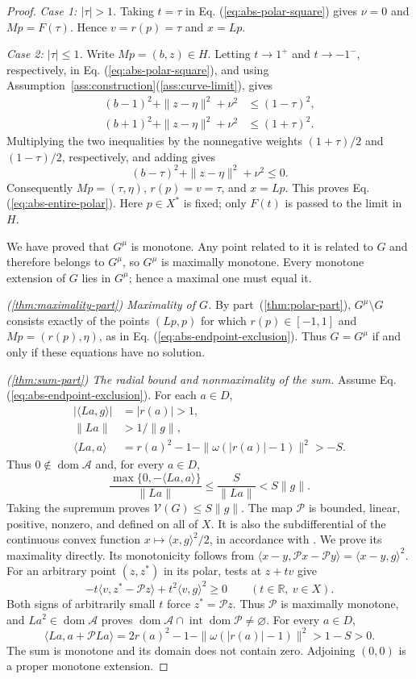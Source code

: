 \documentclass[11pt]{article}
\newcommand{\R}{\mathbb R}
\newcommand{\dom}{\operatorname{dom}}
\newcommand{\pair}[2]{\langle #1,#2\rangle}
\theoremstyle{definition}
\theoremstyle{remark}
\begin{document}
\begin{proof}
\emph{Case 1: $|\tau|>1$.} Taking $t=\tau$ in Eq. (\ref{eq:abs-polar-square}) gives $\nu=0$ and $Mp=F(\tau)$. Hence $v=r(p)=\tau$ and $x=Lp$.

\emph{Case 2: $|\tau|\le1$.} Write $Mp=(b,z)\in H$. Letting $t\to1^+$ and $t\to-1^-$, respectively, in Eq. (\ref{eq:abs-polar-square}), and using Assumption~\ref{ass:construction}\textup{(\ref{ass:curve-limit})}, gives
\[
\begin{aligned}
(b-1)^2+\|z-\eta\|^2+\nu^2&\le(1-\tau)^2,\\
(b+1)^2+\|z-\eta\|^2+\nu^2&\le(1+\tau)^2.
\end{aligned}
\]
Multiplying the two inequalities by the nonnegative weights $(1+\tau)/2$ and $(1-\tau)/2$, respectively, and adding gives
\[
(b-\tau)^2+\|z-\eta\|^2+\nu^2\le0.
\]
Consequently $Mp=(\tau,\eta)$, $r(p)=v=\tau$, and $x=Lp$. This proves Eq. (\ref{eq:abs-entire-polar}). Here $p\in X^*$ is fixed; only $F(t)$ is passed to the limit in $H$.

We have proved that $G^\mu$ is monotone. Any point related to it is related to $G$ and therefore belongs to $G^\mu$, so $G^\mu$ is maximally monotone. Every monotone extension of $G$ lies in $G^\mu$; hence a maximal one must equal it.

\noindent\textit{\textup{(\ref{thm:maximality-part})} Maximality of $G$.}
By part~\textup{(\ref{thm:polar-part})}, $G^\mu\setminus G$ consists exactly of the points $(Lp,p)$ for which $r(p)\in[-1,1]$ and $Mp=(r(p),\eta)$, as in Eq. (\ref{eq:abs-endpoint-exclusion}). Thus $G=G^\mu$ if and only if these equations have no solution.

\noindent\textit{\textup{(\ref{thm:sum-part})} The radial bound and nonmaximality of the sum.}
Assume Eq. (\ref{eq:abs-endpoint-exclusion}). For each $a\in D$,
\[
\begin{aligned}
|\pair{La}{g}|&=|r(a)|>1,\\
\|La\|&>1/\|g\|,\\
\pair{La}{a}&=r(a)^2-1-\|\omega(|r(a)|-1)\|^2>-S.
\end{aligned}
\]
Thus $0\notin\dom\mathcal A$ and, for every $a\in D$,
\[
\frac{\max\{0,-\pair{La}{a}\}}{\|La\|}
\le\frac{S}{\|La\|}<S\|g\|.
\]
Taking the supremum proves $\mathcal V(G)\le S\|g\|$. The map $\mathcal P$ is bounded, linear, positive, nonzero, and defined on all of $X$. It is also the subdifferential of the continuous convex function $x\mapsto\pair{x}{g}^2/2$, in accordance with \cite{rockafellar1970subdiff}. We prove its maximality directly. Its monotonicity follows from $\pair{x-y}{\mathcal Px-\mathcal Py}=\pair{x-y}{g}^2$. For an arbitrary point $(z,z^*)$ in its polar, tests at $z+tv$ give
\[
-t\pair{v}{z^*-\mathcal Pz}+t^2\pair{v}{g}^2\ge0
\qquad(t\in\R,\ v\in X).
\]
Both signs of arbitrarily small $t$ force $z^*=\mathcal Pz$. Thus $\mathcal P$ is maximally monotone, and $La^2\in\dom\mathcal A$ proves $\dom\mathcal A\cap\operatorname{int}\dom\mathcal P\ne\varnothing$. For every $a\in D$,
\[
\pair{La}{a+\mathcal PLa}
=2r(a)^2-1-\|\omega(|r(a)|-1)\|^2>1-S>0.
\]
The sum is monotone and its domain does not contain zero. Adjoining $(0,0)$ is a proper monotone extension.
\end{proof}
\end{document}
